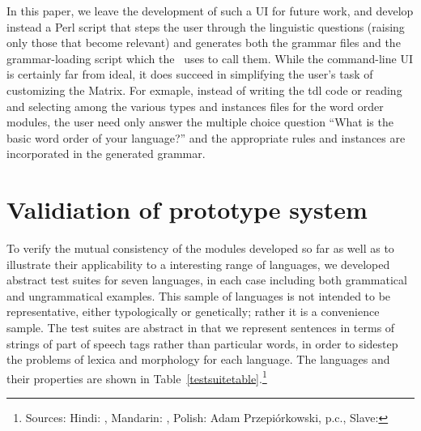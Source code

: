 In this paper, we leave the development of such a UI for future work,
and develop instead a Perl script that steps the user through the
linguistic questions (raising only those that become relevant) and
generates both the grammar files and the grammar-loading script which
the \lkb\ uses to call them.  While the command-line UI is certainly far
from ideal, it does succeed in simplifying the user's task of
customizing the Matrix.
For exmaple, instead of writing the tdl code or reading and
selecting among the various types and instances files for the word
order modules, the user need only answer the multiple choice question
``What is the basic word order of your language?'' and the appropriate
rules and instances are incorporated in the generated grammar.


\section{Validiation of prototype system}

To verify the mutual consistency of the modules developed so far as
well as to illustrate their applicability to a interesting range of
languages, we developed abstract test suites for seven languages, in
each case including both grammatical and ungrammatical examples.  This
sample of languages is not intended to be representative, either
typologically or genetically; rather it is a convenience sample.  The
test suites are abstract in that we represent sentences in terms of
strings of part of speech tags rather than particular words, in order
to sidestep the problems of lexica and morphology for each language.
The languages and their properties are shown in
Table~\ref{testsuitetable}.\footnote{Sources: Hindi: ,
Mandarin: , Polish: Adam Przepi\'{o}rkowski, p.c.,
Slave: }


